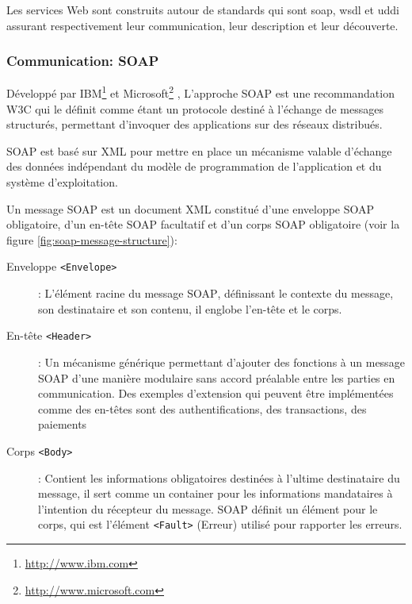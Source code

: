   Les services Web sont construits autour de standards qui sont
  \acrshort{soap}, \acrshort{wsdl} et \acrshort{uddi} assurant
  respectivement leur communication, leur description et leur découverte.

    \subsubsection{Communication: SOAP}
    \label{sec:soap}
    Développé par IBM\footnote{\url{http://www.ibm.com}} et
    Microsoft\footnote{\url{http://www.microsoft.com}}
    \cite{box2000simple}, L'approche \textsc{SOAP} est une
    recommandation \textsc{W3C} \cite{mitra2003soap} qui le définit
    comme étant un protocole destiné à l'échange de messages
    structurés, permettant d'invoquer des applications sur des réseaux
    distribués.

    \textsc{SOAP} est basé sur \textsc{XML} pour mettre en place un
    mécanisme valable d'échange des données indépendant du modèle de
    programmation de l'application et du système d'exploitation.

    Un message \textsc{SOAP} est un document XML constitué d'une
    enveloppe \textsc{SOAP} obligatoire, d'un en-tête \textsc{SOAP}
    facultatif et d'un corps \textsc{SOAP} obligatoire (voir la figure
    \ref{fig:soap-message-structure}):

    

    \SpecialItem
    \begin{description}
      \item[Enveloppe \texttt{<Envelope>}]: L'élément racine du message
        \textsc{SOAP}, définissant le contexte du message, son
        destinataire et son contenu, il englobe l'en-tête et le corps.
        
      \item[En-tête \texttt{<Header>}]: Un mécanisme générique
        permettant d'ajouter des fonctions à un message \textsc{SOAP}
        d'une manière modulaire sans accord préalable entre les
        parties en communication.  Des exemples d'extension qui
        peuvent être implémentées comme des en-têtes sont des
        authentifications, des transactions, des paiements
        
      \item[Corps \texttt{<Body>}]: Contient les informations
        obligatoires destinées à l'ultime destinataire du message, il
        sert comme un container pour les informations mandataires à
        l'intention du récepteur du message.  \textsc{SOAP} définit un
        élément pour le corps, qui est l'élément \texttt{<Fault>}
        (Erreur) utilisé pour rapporter les erreurs.
    \end{description}

